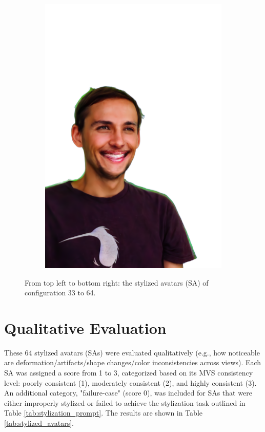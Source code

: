 \begin{figure}[ht]
\begin{subfigure}{0.08\linewidth}
        \includegraphics[width=\textwidth]{Figures/results/high/simon_smile/11_render.png}
	\end{subfigure}
	\caption{From top left to bottom right: the stylized avatars (SA) of configuration 33 to 64.}
    \label{fig:all_stylized_results_high}
\end{figure}

\section{Qualitative Evaluation}
These 64 stylized avatars (SAs) were evaluated qualitatively (e.g., how noticeable are deformation/artifacts/shape changes/color inconsistencies across views). Each SA was assigned a score from 1 to 3, categorized based on its MVS consistency level: poorly consistent (1), moderately consistent (2), and highly consistent (3). An additional category, "failure-case" (score 0), was included for SAs that were either improperly stylized or failed to achieve the stylization task outlined in Table \ref{tab:stylization_prompt}. The results are shown in Table \ref{tab:stylized_avatars}.

